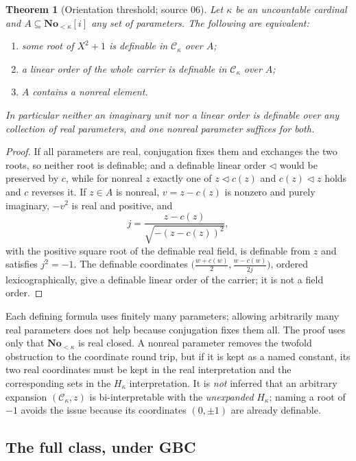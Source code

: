 \documentclass[11pt,letterpaper]{article}
\newtheorem{theorem}{Theorem}[section]
\theoremstyle{definition}
\theoremstyle{remark}
\newcommand{\No}{\mathbf{No}}
\newcommand{\C}{\mathcal C}
\begin{document}
\begin{theorem}[Orientation threshold; source 06]\label{hset:thm:threshold}
Let $\kappa$ be an uncountable cardinal and $A\subseteq\No_{<\kappa}[i]$ any set of
parameters. The following are equivalent:
\begin{enumerate}[label=(\roman*)]
\item some root of $X^2+1$ is definable in $\C_\kappa$ over $A$;
\item a linear order of the whole carrier is definable in $\C_\kappa$ over $A$;
\item $A$ contains a nonreal element.
\end{enumerate}
In particular neither an imaginary unit nor a linear order is definable over any
collection of real parameters, and one nonreal parameter suffices for both.
\end{theorem}
\begin{proof}
If all parameters are real, conjugation fixes them and exchanges the two roots,
so neither root is definable; and a definable linear order $\triangleleft$
would be preserved by $c$, while for nonreal $z$ exactly one of
$z\triangleleft c(z)$ and $c(z)\triangleleft z$ holds and $c$ reverses it. If
$z\in A$ is nonreal, $v=z-c(z)$ is nonzero and purely imaginary, $-v^2$ is real
and positive, and
\[
 j=\frac{z-c(z)}{\sqrt{-(z-c(z))^2}},
\]
with the positive square root of the definable real field, is definable from
$z$ and satisfies $j^2=-1$. The definable coordinates
$\bigl(\tfrac{w+c(w)}2,\tfrac{w-c(w)}{2j}\bigr)$, ordered lexicographically,
give a definable linear order of the carrier; it is not a field order.
\end{proof}

Each defining formula uses finitely many parameters; allowing arbitrarily many
real parameters does not help because conjugation fixes them all. The proof uses
only that $\No_{<\kappa}$ is real closed. A nonreal parameter removes the twofold
obstruction to the coordinate round trip, but if it is kept as a named constant,
its two real coordinates must be kept in the real interpretation and the
corresponding sets in the $H_\kappa$ interpretation. It is \emph{not} inferred
that an arbitrary expansion $(\C_\kappa,z)$ is bi-interpretable with the
\emph{unexpanded} $H_\kappa$; naming a root of $-1$ avoids the issue because its
coordinates $(0,\pm1)$ are already definable.

\subsection{The full class, under GBC}
\end{document}
